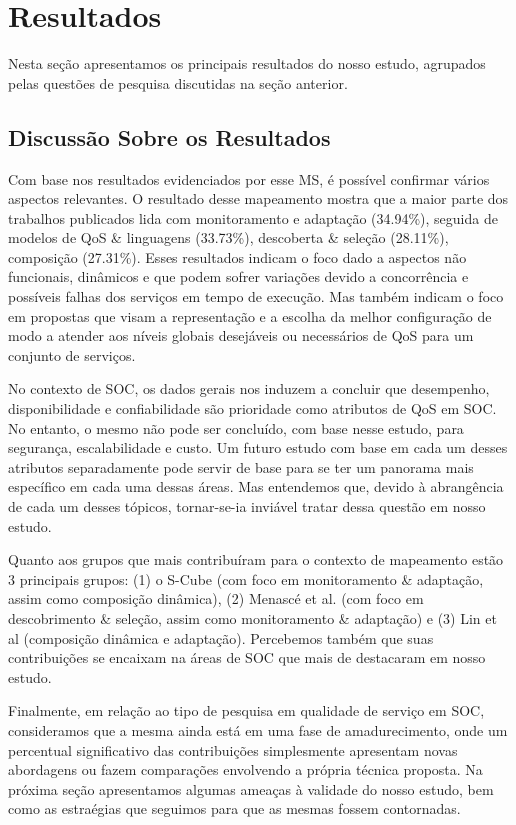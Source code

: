 \section{Resultados}\label{sec:resultados}

Nesta se\c c\~{a}o apresentamos os principais resultados do nosso
estudo, agrupados pelas quest\~{o}es de pesquisa discutidas na se\c
c\~{a}o anterior. 






\subsection{Discuss\~{a}o Sobre os Resultados}

Com base nos resultados evidenciados por esse MS, \'{e} poss\'{i}vel
confirmar v\'{a}rios aspectos relevantes. O resultado desse mapeamento
mostra que a maior parte dos trabalhos publicados lida com
monitoramento e adapta\c{c}\~{a}o (34.94\%), seguida de modelos de QoS
\& linguagens (33.73\%), descoberta \& sele\c{c}\~{a}o (28.11\%),
composi\c{c}\~{a}o (27.31\%). Esses resultados indicam o foco dado a
aspectos n\~{a}o funcionais, din\^{a}micos e que podem sofrer
varia\c{c}\~{o}es devido a concorrência e possíveis falhas dos
servi\c{c}os em tempo de execu\c{c}\~{a}o. Mas tamb\'{e}m indicam o
foco em propostas que visam a representa\c{c}\~{a}o e a escolha da
melhor configura\c{c}\~{a}o de modo a atender aos níveis globais
desej\'{a}veis ou necess\'{a}rios de QoS para um conjunto de
servi\c{c}os. 

No contexto de SOC, os dados gerais nos induzem a
concluir que desempenho, disponibilidade e confiabilidade s\~{a}o
prioridade como atributos de QoS em SOC. No entanto, o mesmo n\~{a}o
pode ser concluído, com base nesse estudo, para seguran\c{c}a,
escalabilidade e custo. Um futuro estudo com base em cada um desses
atributos separadamente pode servir de base para se ter um panorama
mais espec\'{i}fico em cada uma dessas \'{a}reas. Mas entendemos que,
devido \`{a} abrang\^{e}ncia de cada um desses t\'{o}picos,
tornar-se-ia invi\'{a}vel tratar dessa quest\~{a}o em nosso
estudo. 

Quanto aos grupos que mais contribu\'{i}ram para o contexto de
mapeamento est\~{a}o 3 principais grupos: (1) o S-Cube (com foco em
monitoramento \& adapta\c{c}\~{a}o, assim como composi\c{c}\~{a}o
din\^{a}mica), (2) Menasc\'{e} et al. (com foco em descobrimento \&
sele\c{c}\~{a}o, assim como monitoramento \& adapta\c{c}\~{a}o) e (3)
Lin et al (composi\c{c}\~{a}o din\^{a}mica e
adapta\c{c}\~{a}o). Percebemos tamb\'{e}m que suas
contribui\c{c}\~{o}es se encaixam na \'{a}reas de SOC que mais de
destacaram em nosso estudo. 

Finalmente, em rela\c c\~{a}o ao tipo de pesquisa em
qualidade de servi\c{c}o em SOC, consideramos que a mesma ainda
est\'{a} em uma fase de amadurecimento, 
onde um percentual significativo das contribui\c{c}\~{o}es
simplesmente apresentam 
novas abordagens ou fazem compara\c{c}\~{o}es envolvendo a 
própria t\'{e}cnica proposta. Na pr\'{o}xima se\c c\~{a}o apresentamos
algumas amea\c cas \`{a} validade do nosso estudo, bem como as
estra\'{e}gias que seguimos para que as mesmas
fossem contornadas.

